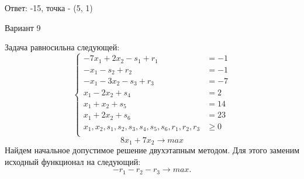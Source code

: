 \documentclass{article}%
\begin{document}
\begin{flushright}%
Ответ: {-}15, точка {-} (5, 1)%
\end{flushright}%
\newpage%
\begin{center}%
\begin{Huge}%
Вариант 9%
\end{Huge}%
\end{center}%
Задача равносильна следующей: %
\[%
\left\{\begin{aligned}-7x_{1}+2x_{2}-s_{1}+r_{1} & =-1 \\-x_{1}-s_{2}+r_{2} & =-1 \\-x_{1}-3x_{2}-s_{3}+r_{3} & =-7 \\x_{1}-2x_{2}+s_{4} & =2 \\x_{1}+x_{2}+s_{5} & =14 \\x_{1}+2x_{2}+s_{6} & =23 \\x_{1},x_{2},s_{1},s_{2},s_{3},s_{4},s_{5},s_{6},r_{1},r_{2},r_{3} & \ge 0 \\ \end{aligned}\right.%
\]%
\[%
8x_{1}+7x_{2}  \to max%
\]%
Найдем начальное допустимое решение двухэтапным методом. Для этого заменим исходный функционал на следующий: %
\[%
-r_{1}-r_{2}-r_{3}\to max.%
\]%
\end{document}
